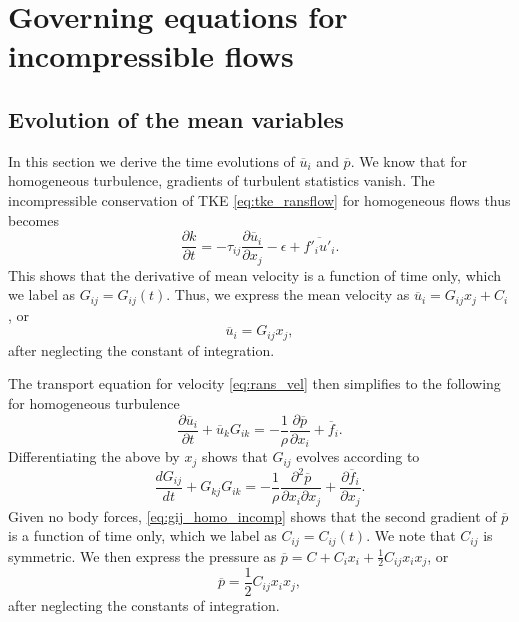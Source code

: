 \documentclass[oneside,a4paper,11pt]{report}
\newcommand{\favg}{\overline{f}}
\newcommand{\pavg}{\overline{p}}
\newcommand{\uavg}{\overline{u}}
\newcommand{\ffluc}{f'}
\newcommand{\ufluc}{u'}
\newcommand{\rs}{\tau}          %
\begin{document}
\chapter{Governing equations for incompressible flows}

\section{Evolution of the mean variables}
\label{sec:homo_mean_incomp}
In this section we derive the time evolutions of $\uavg_i$ and $\pavg$. We know that for homogeneous turbulence, gradients of turbulent statistics vanish. The incompressible conservation of TKE \cref{eq:tke_ransflow} for homogeneous flows thus becomes
\begin{equation}
\frac{\partial k}{\partial t} = -\rs_{ij} \frac{\partial \uavg_i}{\partial x_j} - \epsilon + \overline{ \ffluc_i \ufluc_i }.
\end{equation}
This shows that the derivative of mean velocity is a function of time only, which we label as $G_{ij} = G_{ij}(t)$. Thus, we express the mean velocity as $\uavg_i = G_{ij} x_j + C_i$, or 
\begin{equation}
\label{eq:ui_homo_incomp}
\uavg_i = G_{ij} x_j ,
\end{equation}
after neglecting the constant of integration.

The transport equation for velocity \cref{eq:rans_vel} then simplifies to the following for homogeneous turbulence
\begin{equation}
\frac{\partial \uavg_i}{\partial t} + \uavg_k G_{ik} = -\frac{1}{\rho} \frac{\partial \pavg}{\partial x_i} + \favg_i.
\end{equation}
Differentiating the above by $x_j$ shows that $G_{ij}$ evolves according to
\begin{equation}
\label{eq:gij_homo_incomp}
\frac{d G_{ij} }{d t} + G_{kj}G_{ik} = -\frac{1}{\rho} \frac{\partial ^2 \pavg}{\partial x_i \partial x_j} + \frac{\partial \favg_i}{\partial x_j} .
\end{equation}
Given no body forces, \cref{eq:gij_homo_incomp} shows that the second gradient of $\pavg$ is a function of time only, which we label as $C_{ij} = C_{ij}(t)$. We note that $C_{ij}$ is symmetric. We then express the pressure as $\pavg = C + C_i x_i + \frac{1}{2} C_{ij} x_ix_j$, or
\begin{equation}
    \pavg = \frac{1}{2} C_{ij} x_i x_j,
\end{equation}
after neglecting the constants of integration. 
\end{document}
